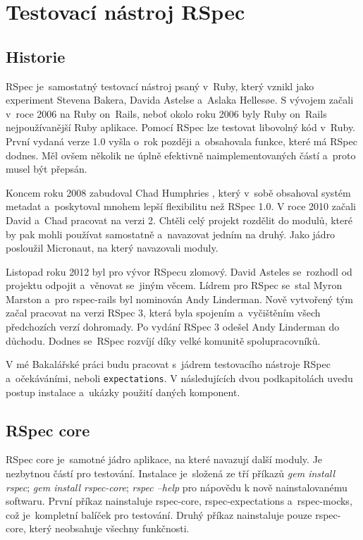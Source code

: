 \section {Testovací nástroj RSpec}
\subsection{Historie}
\par RSpec\cite{davidchelimsky2015} je~samostatný testovací nástroj psaný v~Ruby, který vznikl jako experiment Stevena Bakera, Davida Astelse a~Aslaka Hellesøe. S vývojem začali v~roce 2006 na Ruby on~Rails, neboť okolo roku 2006 byly Ruby on~Rails nejpoužívanější Ruby aplikace. Pomocí RSpec lze testovat libovolný kód v~Ruby. První vydaná verze 1.0 vyšla o~rok později a~obsahovala funkce, které má RSpec dodnes. Měl ovšem několik ne úplně efektivně naimplementovaných částí a~proto musel být přepsán.
\par Koncem roku 2008 zabudoval Chad Humphries , který v~sobě obsahoval systém metadat a~poskytoval mnohem lepší flexibilitu než RSpec 1.0. V roce 2010 začali David a~Chad pracovat na verzi 2. Chtěli celý projekt rozdělit do modulů, které by pak mohli používat samostatně a~navazovat jedním na druhý. Jako jádro posloužil Micronaut, na který navazovali moduly.
\par Listopad roku 2012 byl pro vývor RSpecu zlomový. David Asteles se~rozhodl od projektu odpojit a~věnovat se~jiným věcem. Lídrem pro RSpec se~stal Myron Marston a~pro rspec-rails byl nominován Andy Linderman. Nově vytvořený tým začal pracovat na verzi RSpec 3, která byla spojením a~vyčištěním všech předchozích verzí dohromady. Po vydání RSpec 3 odešel Andy Linderman do důchodu. Dodnes se~RSpec rozvíjí díky velké komunitě spolupracovníků.
\par V mé Bakalářské práci budu pracovat s~jádrem testovacího nástroje RSpec a~očekáváními, neboli \texttt{expectations}. V následujících dvou podkapitolách uvedu postup instalace a~ukázky použití daných komponent.

\subsection{RSpec core}
\par RSpec core je~samotné jádro aplikace, na které navazují další moduly. Je nezbytnou částí pro testování. Instalace je~složená ze tří příkazů \textit{gem install rspec}; \textit{gem install rspec-core}; \textit{rspec --help} pro nápovědu k nově nainstalovanému softwaru. První příkaz nainstaluje rspec-core, rspec-expectations a~rspec-mocks, což je~kompletní balíček pro testování. Druhý příkaz nainstaluje pouze rspec-core, který neobsahuje všechny funkčnosti. 

